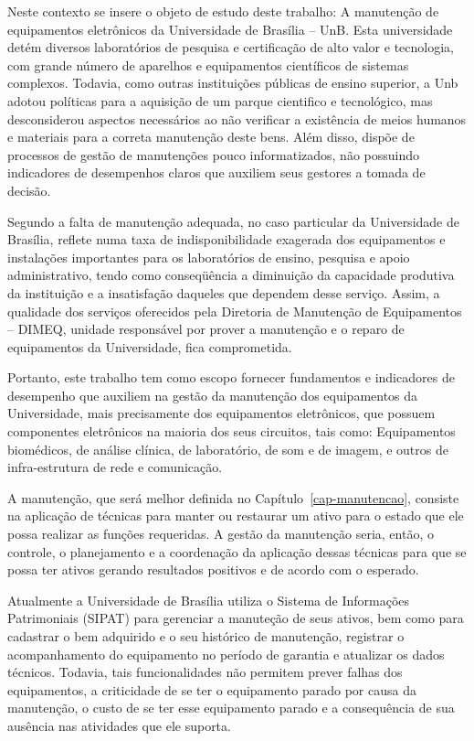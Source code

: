 Neste contexto se insere o objeto de estudo deste trabalho: A manutenção de equipamentos eletrônicos da Universidade de Brasília – UnB. Esta universidade detém diversos laboratórios de pesquisa e certificação de alto valor e tecnologia, com grande número de aparelhos e equipamentos científicos de sistemas complexos. Todavia, como outras instituições públicas de ensino superior, a Unb adotou políticas para a aquisição de um parque cientifico e tecnológico, mas desconsiderou aspectos necessários ao não verificar a existência de meios humanos e materiais para a correta manutenção deste bens. Além disso, dispõe de processos de gestão de manutenções pouco informatizados, não possuindo indicadores de desempenhos claros que auxiliem seus gestores a tomada de decisão.

Segundo \cite{limacastilho2006} a falta de manutenção adequada, no caso particular da Universidade de Brasília,  reflete numa taxa de indisponibilidade exagerada dos equipamentos e instalações importantes para os laboratórios de ensino, pesquisa e apoio administrativo, tendo como conseqüência a diminuição da capacidade produtiva da instituição e a insatisfação daqueles que dependem desse serviço. Assim, a qualidade dos serviços oferecidos pela Diretoria de Manutenção de Equipamentos – DIMEQ, unidade responsável por prover a manutenção e o reparo de equipamentos da Universidade, fica comprometida. 

Portanto, este trabalho tem como escopo fornecer fundamentos e indicadores de desempenho que auxiliem na gestão da manutenção dos equipamentos da Universidade, mais precisamente dos equipamentos eletrônicos, que possuem componentes eletrônicos na maioria dos seus circuitos, tais como: Equipamentos biomédicos, de análise clínica, de laboratório, de som e de imagem, e outros de infra-estrutura de rede e comunicação.

A manutenção, que será melhor definida no Capítulo~\ref{cap-manutencao}, consiste na aplicação de técnicas para manter ou restaurar um ativo para o estado que ele possa realizar as funções requeridas. A gestão da manutenção seria, então, o controle, o planejamento e a coordenação da aplicação dessas técnicas para que se possa ter ativos gerando resultados positivos e de acordo com o esperado.

Atualmente a Universidade de Brasília utiliza o Sistema de Informações Patrimoniais (SIPAT) para gerenciar a manuteção de seus ativos, bem como para cadastrar o bem adquirido e o seu histórico de manutenção, registrar o acompanhamento do equipamento no período de garantia e atualizar os dados técnicos. Todavia, tais funcionalidades não permitem prever falhas dos equipamentos, a criticidade de se ter o equipamento parado por causa da manutenção, o custo de se ter esse equipamento parado e a consequência de sua ausência nas atividades que ele suporta. 

